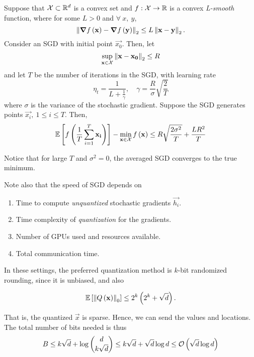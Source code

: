 \documentclass[twoside]{article}
\begin{document}
\begin{theorem}
    \label{thm:avg-sgd}
    Suppose that \(\mathcal X\subset\mathbb R^d\) is a convex set and \(f:\mathcal X\rightarrow\mathbb R\) is a 
    convex \emph{L-smooth} function, where for some \(L > 0\) and \(\forall\ x,\ y\),
    \begin{equation}
        \left\lVert\boldsymbol{\mathbf{\nabla}}f\left(\boldsymbol{\mathbf{x}}\right)-\boldsymbol{\mathbf{\nabla}}f\left(\boldsymbol{\mathbf{y}}\right)\right\rVert_2 \le L\left\lVert\boldsymbol{\mathbf{x}}-\boldsymbol{\mathbf{y}}\right\rVert_2.
        \label{eq:L-smooth}
    \end{equation}
    Consider an SGD with initial point \(\vec{x_0}\). Then, let
    \begin{equation}
        \sup_{\boldsymbol{\mathbf{x}}\in\mathcal X}\left\lVert\boldsymbol{\mathbf{x}}-\boldsymbol{\mathbf{x_0}}\right\rVert_2 \le R
    \end{equation}
    and let \(T\) be the number of iterations in the SGD, with learning rate
    \begin{equation}
        \eta_t = \frac{1}{L + \frac{1}{\gamma}},\quad \gamma = \frac{R}{\sigma}\sqrt{\frac{2}{T}}
    \end{equation}
    where \(\sigma\) is the variance of the stochastic gradient. Suppose the 
    SGD generates points \(\vec{x_i},\ 1 \le i \le T\). Then,
    \begin{equation}
        \mathbb{E}\left[ f\left(\frac{1}{T}\sum_{i=1}^T\boldsymbol{\mathbf{x_i}}\right) \right] - \min_{\boldsymbol{\mathbf{x}}\in\mathcal X}f\left(\boldsymbol{\mathbf{x}}\right) \le R\sqrt{\frac{2\sigma^2}{T}} + \frac{LR^2}{T}
    \end{equation}
\end{theorem}

Notice that for large \(T\) and \(\sigma^2 = 0\), the averaged SGD converges 
to the true minimum.

Note also that the speed of SGD depends on

\begin{enumerate}
    \item Time to compute \emph{unquantized} stochastic gradients \(\vec{h_i}\).
    \item Time complexity of \emph{quantization} for the gradients.
    \item Number of GPUs used and resources available.
    \item Total communication time.
\end{enumerate}

In these settings, the preferred quantization method is \(k\)-bit randomized
rounding, since it is unbiased, and also

\begin{equation}
    \mathbb{E}\left[ \left\lVert Q\left(\boldsymbol{\mathbf{x}}\right)\right\rVert_0 \right] \le 2^k\left(2^k + \sqrt{d}\right).
    \label{eq:rr-L0-bound}
\end{equation}

That is, the quantized \(\vec{x}\) is sparse. Hence, we can send the values and 
locations. The total number of bits needed is thus
\begin{equation}
    B \le k\sqrt{d} + \log\binom{d}{k\sqrt{d}} \le k\sqrt{d}+ \sqrt{d}\log d \le \mathcal O\left(\sqrt{d}\log d\right)
    \label{eq:num-bits-sparse}
\end{equation}
\end{document}
